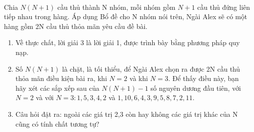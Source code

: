 \begin{bt}
{		\\ 
		Chia $N(N+1)$ cầu thủ thành N nhóm, mỗi nhóm gồm $N+1$ cầu thủ đứng liên tiếp nhau trong hàng. Áp dụng Bổ đề cho N nhóm nói trên, Ngài Alex sẽ có một hàng gồm 2N cầu thủ thỏa mãn yêu cầu đề bài.
		\begin{nx}\hfill
			\begin{enumerate}[1.]
				\item Về thực chất, lời giải 3 là lời giải 1, được trình bày bằng phương pháp quy nạp.
				\item Số $N(N+1)$ là chặt, là tối thiểu, để Ngài Alex chọn ra được 2N cầu thủ thỏa mãn điều kiện bài ra, khi $N=2$ và khi $N=3$. Để thấy điều này, bạn hãy xét các sắp xếp sau của $N(N+1)-1$ số nguyên dương đầu tiên, với $N=2$ và với $N=3:1,5,3,4,2$ và $1,10,6,4,3,9,5,8,7,2,11.$ 
				\item Câu hỏi đặt ra: ngoài các giá trị 2,3 còn hay không các giá trị khác của N cũng có tính chất tương tự?
			\end{enumerate}
		\end{nx}
	}
\end{bt}
